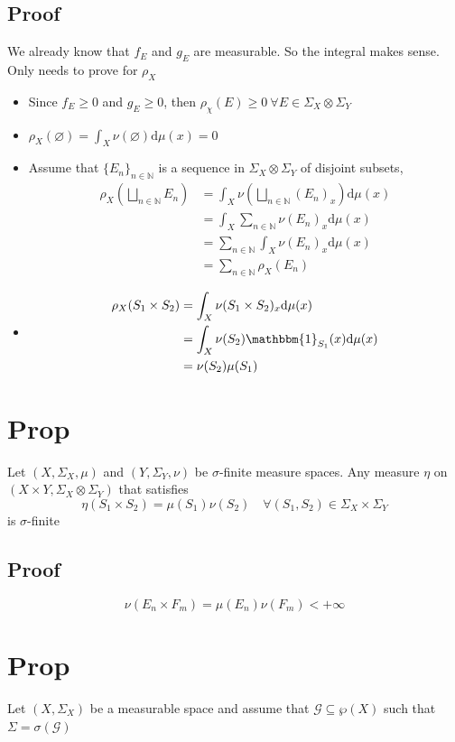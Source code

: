 \documentclass{book}
\begin{document}
\subsection*{Proof}
We already know that $f_E$ and $g_E$ are measurable. So the integral makes sense. Only needs to prove for $\rho_X$
\begin{itemize}
    \item Since $f_E\geq 0$ and $g_E\geq 0$, then $\rho_\chi(E)\geq 0\ \forall E\in \Sigma_X\otimes \Sigma_Y$
    \item $\rho_X(\varnothing)=\int_X\nu(\varnothing)\text{d}\mu(x)=0$
    \item Assume that $\{E_n\}_{n\in \mathbb{N}}$ is a sequence in $\Sigma_X\otimes \Sigma_Y$ of disjoint subsets,
    $$\begin{aligned}
        \rho_X(\bigsqcup\limits_{n\in \mathbb{N}}E_n)&=\int_X\nu(\bigsqcup\limits_{n\in \mathbb{N}}(E_n)_x)\text{d}\mu(x)\\
        &=\int_X\sum\limits_{n\in \mathbb{N}}\nu(E_n)_x\text{d}\mu(x)\\
        &=\sum\limits_{n\in \mathbb{N}}\int_X\nu(E_n)_x\text{d}\mu(x)\\
        &=\sum\limits_{n\in \mathbb{N}}\rho_X(E_n)
    \end{aligned}$$
    \item$$\begin{aligned}
        \rho_X(S_1\times S_2)&=\int_X\nu(S_1\times S_2)_x\text{d}\mu(x)\\
        &=\int_X\nu(S_2)\mathbbm{1}_{S_1}(x)\text{d}\mu(x)\\
        &=\nu(S_2)\mu(S_1)
    \end{aligned}$$
\end{itemize}
\section{Prop}
\label{Prop 53.11}
Let $(X,\Sigma_X,\mu)$ and $(Y,\Sigma_Y,\nu)$ be $\sigma$-finite measure spaces. Any measure $\eta$ on $(X\times Y,\Sigma_X\otimes\Sigma_Y)$ that satisfies
$$\eta(S_1\times S_2)=\mu(S_1)\nu(S_2)\quad \forall(S_1,S_2)\in\Sigma_X\times \Sigma_Y$$
is $\sigma$-finite
\subsection*{Proof}
$$\nu(E_n\times F_m)=\mu(E_n)\nu(F_m)<+\infty$$
\section{Prop}
\label{Prop 53.12}
Let $(X,\Sigma_X)$ be a measurable space and assume that $\mathcal{G}\subseteq\wp(X)$ such that $\Sigma=\sigma(\mathcal{G})$
\end{document}
